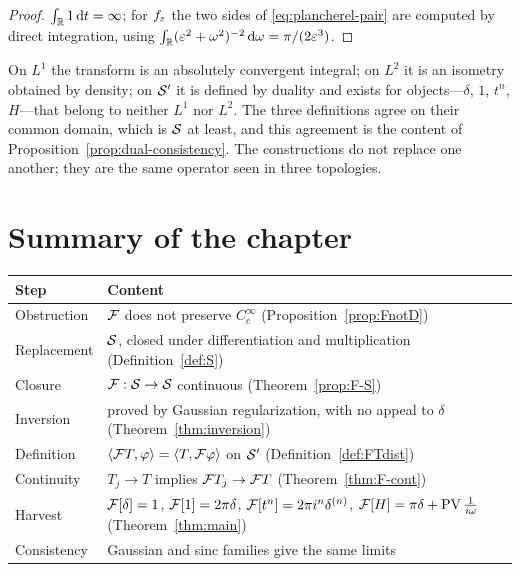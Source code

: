 \begin{proof}
$\int_{\mathbb{R}}1\,\mathrm{d} t=\infty$; for $f_{\varepsilon}$ the two sides of
\eqref{eq:plancherel-pair} are computed by direct integration, using
$\int_{\mathbb{R}}(\varepsilon^{2}+\omega^{2})^{-2}\,\mathrm{d}\omega=\pi/(2\varepsilon^{3})$.
\end{proof}

\begin{remark}
On $L^{1}$ the transform is an absolutely convergent integral; on $L^{2}$ it is an isometry obtained
by density; on $\mathcal{S}'$ it is defined by duality and exists for objects---$\delta$, $1$, $t^{n}$,
$H$---that belong to neither $L^{1}$ nor $L^{2}$. The three definitions agree on their common domain,
which is $\mathcal{S}$ at least, and this agreement is the content of
Proposition~\ref{prop:dual-consistency}. The constructions do not replace one another; they are the
same operator seen in three topologies.
\end{remark}

\section{Summary of the chapter}

\begin{center}
\small
\begin{tabular}{@{}p{3.4cm}p{9.4cm}@{}}
\toprule
Step & Content \\
\midrule
Obstruction & $\mathcal{F}$ does not preserve $C_{c}^{\infty}$ (Proposition~\ref{prop:FnotD}) \\
Replacement & $\mathcal{S}$, closed under differentiation and multiplication (Definition~\ref{def:S}) \\
Closure & $\mathcal{F}:\mathcal{S}\to\mathcal{S}$ continuous (Theorem~\ref{prop:F-S}) \\
Inversion & proved by Gaussian regularization, with no appeal to $\delta$
(Theorem~\ref{thm:inversion}) \\
Definition & $\langle \mathcal{F} T,\varphi\rangle=\langle T,\mathcal{F}\varphi\rangle$ on $\mathcal{S}'$
(Definition~\ref{def:FTdist}) \\
Continuity & $T_{j}\to T$ implies $\mathcal{F} T_{j}\to\mathcal{F} T$ (Theorem~\ref{thm:F-cont}) \\
Harvest & $\mathcal{F}[\delta]=1$, $\mathcal{F}[1]=2\pi\delta$, $\mathcal{F}[t^{n}]=2\pi i^{n}\delta^{(n)}$,
$\mathcal{F}[H]=\pi\delta+\operatorname{PV}\frac{1}{i\omega}$ (Theorem~\ref{thm:main}) \\
Consistency & Gaussian and sinc families give the same limits \\
\bottomrule
\end{tabular}
\end{center}
